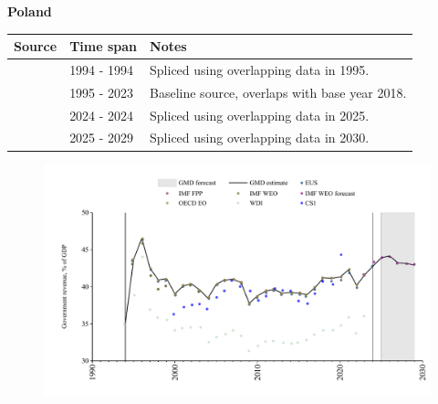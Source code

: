 \documentclass[12pt,a4paper,landscape]{article}
\begin{document}
\begin{adjustbox}{max totalsize={\paperwidth}{\paperheight},center}
\begin{minipage}[t][\textheight][t]{\textwidth}
\vspace*{0.5cm}
{}
\begin{center}
{\Large\bfseries Poland}
\end{center}
\vspace{0.5cm}
\begin{table}[H]
\centering
\small
\begin{tabular}{|l|l|l|}
\hline
\textbf{Source} & \textbf{Time span} & \textbf{Notes} \\
\hline
\rowcolor{white}\cite{WDI}& 1994 - 1994 &Spliced using overlapping data in 1995.\\
\rowcolor{lightgray}\cite{OECD_EO}& 1995 - 2023 &Baseline source, overlaps with base year 2018.\\
\rowcolor{white}\cite{EUS}& 2024 - 2024 &Spliced using overlapping data in 2025.\\
\rowcolor{lightgray}\cite{IMF_WEO_forecast}& 2025 - 2029 &Spliced using overlapping data in 2030.\\
\hline
\end{tabular}
\end{table}
\begin{figure}[H]
\centering
\includegraphics[width=\textwidth,height=0.6\textheight,keepaspectratio]{graphs/POL_govrev_GDP.pdf}
\end{figure}
\end{minipage}
\end{adjustbox}
\end{document}
